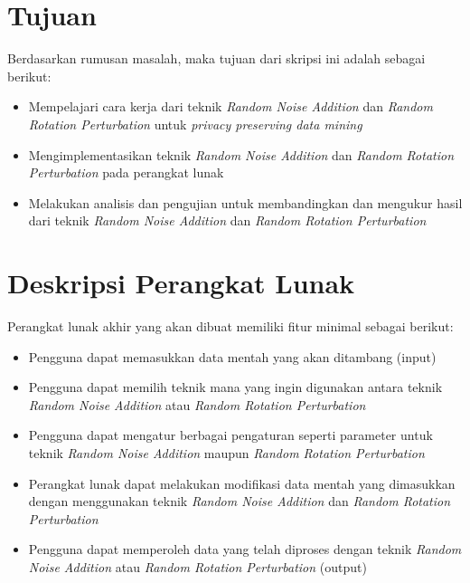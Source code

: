 \documentclass[a4paper,twoside]{article}
\begin{document}
\section{Tujuan}
Berdasarkan rumusan masalah, maka tujuan dari skripsi ini adalah sebagai berikut:
\begin{itemize}
	\item Mempelajari cara kerja dari teknik \textit{Random Noise Addition} dan \textit{Random Rotation Perturbation} untuk \textit{privacy preserving data mining}
	\item Mengimplementasikan teknik \textit{Random Noise Addition} dan \textit{Random Rotation Perturbation} pada perangkat lunak
	\item Melakukan analisis dan pengujian untuk membandingkan dan mengukur hasil dari teknik \textit{Random Noise Addition} dan \textit{Random Rotation Perturbation}
\end{itemize}

\section{Deskripsi Perangkat Lunak}
Perangkat lunak akhir yang akan dibuat memiliki fitur minimal sebagai berikut:
\begin{itemize}
	\item Pengguna dapat memasukkan data mentah yang akan ditambang (input)
	\item Pengguna dapat memilih teknik mana yang ingin digunakan antara teknik \textit{Random Noise Addition} atau \textit{Random Rotation Perturbation}
	\item Pengguna dapat mengatur berbagai pengaturan seperti parameter untuk teknik \textit{Random Noise Addition} maupun \textit{Random Rotation Perturbation}
	\item Perangkat lunak dapat melakukan modifikasi data mentah yang dimasukkan dengan menggunakan teknik \textit{Random Noise Addition} dan \textit{Random Rotation Perturbation}
	\item Pengguna dapat memperoleh data yang telah diproses dengan teknik \textit{Random Noise Addition} atau \textit{Random Rotation Perturbation} (output)
\end{itemize}
\end{document}
